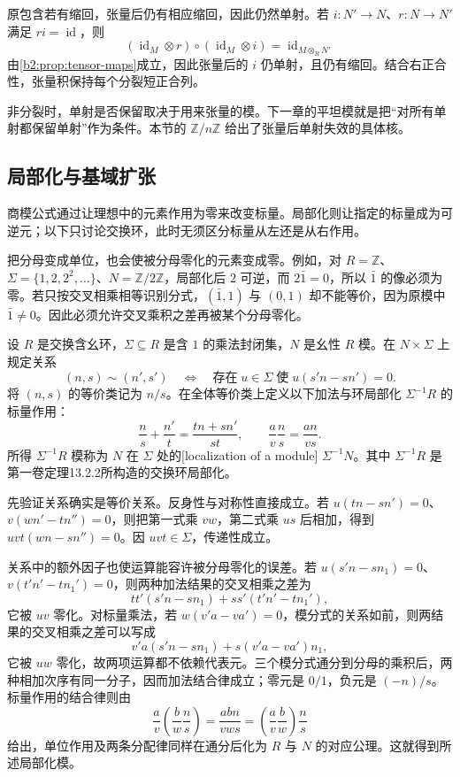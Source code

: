 \ProseParagraphBreak
原包含若有缩回，张量后仍有相应缩回，因此仍然单射。若 \(i:N'\to N\)、\(r:N\to N'\) 满足 \(ri=\operatorname{id}\)，则
\[
	(\operatorname{id}_M\otimes r)\circ(\operatorname{id}_M\otimes i) =\operatorname{id}_{M\otimes_RN'}
\]
由\cref{b2:prop:tensor-maps}成立，因此张量后的 \(i\) 仍单射，且仍有缩回。结合右正合性，张量积保持每个分裂短正合列。

\ProseParagraphBreak
非分裂时，单射是否保留取决于用来张量的模。下一章的平坦模就是把“对所有单射都保留单射”作为条件。本节的 \(\mathbb Z/n\mathbb Z\) 给出了张量后单射失效的具体核。

\subsection{局部化与基域扩张}
\label{b2:subsec:0604:03}

商模公式通过让理想中的元素作用为零来改变标量。局部化则让指定的标量成为可逆元；以下只讨论交换环，此时无须区分标量从左还是从右作用。

\ProseParagraphBreak
把分母变成单位，也会使被分母零化的元素变成零。例如，对 \(R=\mathbb Z\)、\(\Sigma=\{1,2,2^2,\ldots\}\)、\(N=\mathbb Z/2\mathbb Z\)，局部化后 \(2\) 可逆，而 \(2\bar1=0\)，所以 \(\bar1\) 的像必须为零。若只按交叉相乘相等识别分式，\((\bar1,1)\) 与 \((0,1)\) 却不能等价，因为原模中 \(\bar1\ne0\)。因此必须允许交叉乘积之差再被某个分母零化。

\begin{definition}\label{b2:def:localized-module}
	设 \(R\) 是交换含幺环，\(\Sigma\subseteq R\) 是含 \(1\) 的乘法封闭集，\(N\) 是幺性 \(R\) 模。在 \(N\times\Sigma\) 上规定关系
	\[
		(n,s)\sim(n',s')\quad\Longleftrightarrow\quad \text{存在}\;u\in\Sigma\;\text{使}\;u(s'n-sn')=0.
	\]
	将 \((n,s)\) 的等价类记为 \(n/s\)。在全体等价类上定义以下加法与环局部化 \(\Sigma^{-1}R\) 的标量作用：
	\[
		\frac ns+\frac{n'}t=\frac{tn+sn'}{st},\qquad \frac av\frac ns=\frac{an}{vs}.
	\]
	所得 \(\Sigma^{-1}R\) 模称为 \(N\) 在 \(\Sigma\) 处的[localization of a module] \(\Sigma^{-1}N\)。其中 \(\Sigma^{-1}R\) 是第一卷定理13.2.2所构造的交换环局部化。
\end{definition}

先验证关系确实是等价关系。反身性与对称性直接成立。若 \(u(tn-sn')=0\)、\(v(wn'-tn'')=0\)，则把第一式乘 \(vw\)，第二式乘 \(us\) 后相加，得到 \(uvt(wn-sn'')=0\)。因 \(uvt\in\Sigma\)，传递性成立。

\ProseParagraphBreak
关系中的额外因子也使运算能容许被分母零化的误差。若 \(u(s'n-sn_1)=0\)、\(v(t'n'-tn_1')=0\)，则两种加法结果的交叉相乘之差为
\[
	t t'(s'n-sn_1)+s s'(t'n'-tn_1'),
\]
它被 \(uv\) 零化。对标量乘法，若 \(w(v'a-va')=0\)，模分式的关系如前，则两结果的交叉相乘之差可以写成
\[
	v'a(s'n-sn_1)+s(v'a-va')n_1,
\]
它被 \(uw\) 零化，故两项运算都不依赖代表元。三个模分式通分到分母的乘积后，两种相加次序有同一分子，因而加法结合律成立；零元是 \(0/1\)，负元是 \((-n)/s\)。标量作用的结合律则由
\[
	\frac av\left(\frac bw\frac ns\right) =\frac{abn}{vws} =\left(\frac av\frac bw\right)\frac ns
\]
给出，单位作用及两条分配律同样在通分后化为 \(R\) 与 \(N\) 的对应公理。这就得到所述局部化模。

